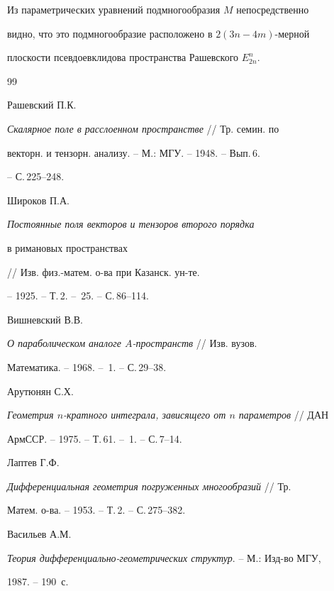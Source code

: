Из параметрических уравнений подмногообразия $M$ непосредственно


видно, что это подмногообразие расположено в $2(3n-4m)$-мерной


плоскости псевдоевклидова пространства Рашевского $E^n_{2n}$.





\begin{thebibliography}{99}







Рашевский П.К.


{\em Скалярное поле в расслоенном пространстве} // Тр. семин. по


векторн. и тензорн. анализу. -- М.: МГУ. -- 1948. -- Вып.\,6.


-- С.\,225--248.




Широков П.А.


{\em Постоянные поля векторов и тензоров второго порядка


в римановых пространствах} // Изв. физ.-матем. о-ва при Казанск. ун-те.


-- 1925. -- Т.\,2. -- \No\,25. -- С.\,86--114.




Вишневский В.В.


{\em О параболическом аналоге $A$-пространств} // Изв. вузов.


Математика. -- 1968. -- \No\,1. -- С.\,29--38.




Арутюнян С.Х.


{\em Геометрия $n$-кратного интеграла, зависящего от $n$ параметров} // ДАН


АрмССР. -- 1975. -- Т.\,61. -- \No\,1. -- С.\,7--14.




Лаптев Г.Ф.


{\em Дифференциальная геометрия погруженных многообразий} // Тр.


Матем. о-ва. -- 1953. -- Т.\,2. -- С.\,275--382.




Васильев А.М.


{\em Теория дифференциально-геометрических структур}. -- М.: Изд-во МГУ,


1987. -- 190~с.



\end{thebibliography}
